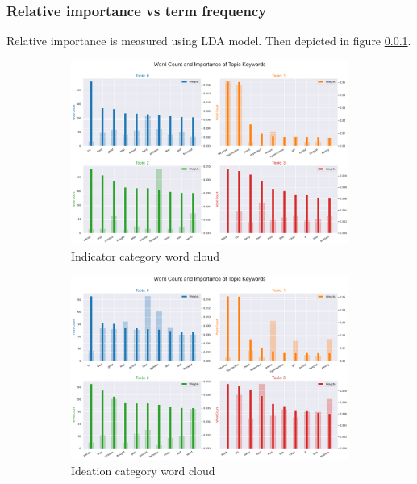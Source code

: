 \documentclass[sn-mathphys,Numbered]{sn-jnl}%
\theoremstyle{thmstyleone}%
\theoremstyle{thmstyletwo}%
\theoremstyle{thmstylethree}%
\begin{document}
\subsubsection{Relative importance vs term frequency}
Relative importance is measured using LDA model. Then depicted in figure \ref{}. 
\begin{figure}[h!]
\centering
\begin{subfigure}{0.45\textwidth}
    \includegraphics[width=\textwidth]{indicator_weight_relative_imp.png}
    \caption{Indicator category word cloud}
    \label{redditdist}
\end{subfigure}
\hfill
\begin{subfigure}{0.45\textwidth}
    \includegraphics[width=\textwidth]{ideation_weight_relative_imp.png}
    \caption{Ideation category word cloud}
    \label{twitterdist}
\end{subfigure}      
\centering
\begin{subfigure}{0.45\textwidth}

\end{subfigure}
\end{figure}
\end{document}
